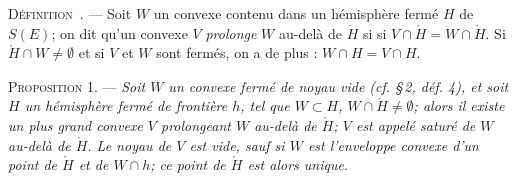 \documentclass[11pt]{article}
\newcommand{\bzcf}[2]{#1}
\newcommand{\bznum}[1]{\if\relax\detokenize{#1}\relax\else\ #1\fi}
\newenvironment{defin}[1][]{\par\medskip\noindent\textsc{Définition\bznum{#1}.} --- }{\par\medskip}
\newenvironment{prop}[1][]{\par\medskip\noindent\textsc{Proposition #1.} --- \itshape}{\par\medskip}
\begin{document}
\begin{defin}
Soit $W$ un convexe contenu dans un hémisphère fermé $H$ de $S(E)$; on dit qu'un convexe $V$
\textit{prolonge} $W$ au-delà de $\mathring{H}$ si si $V\cap\mathring{H}=W\cap\mathring{H}$. Si
$\mathring{H}\cap W\neq\emptyset$ et si $V$ et $W$ sont fermés, on a de plus :
$W\cap H=V\cap H$.
\end{defin}

\begin{prop}[1]
Soit $W$ un convexe fermé de noyau vide (\bzcf{\textit{cf.} \S\,2,
déf. 4}{\ref{bzdef:c3s2d4_conjugues}}), et soit $H$ un hémisphère fermé de frontière $h$, tel que
$W\subset H$, $W\cap\mathring{H}\neq\emptyset$; alors il existe un plus grand convexe $V$
prolongeant $W$ au-delà de $\mathring{H}$; $V$ est appelé \textit{saturé de $W$ au-delà} de
$\mathring{H}$. Le noyau de $V$ est vide, sauf si $W$ est l'enveloppe convexe d'un point de
$\mathring{H}$ et de $W\cap h$; ce point de $\mathring{H}$ est alors unique.
\end{prop}
\end{document}
